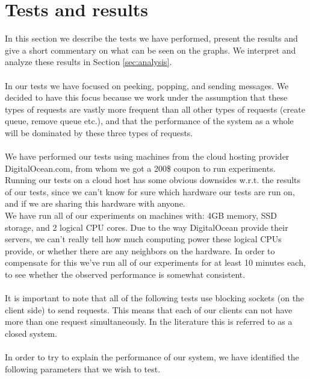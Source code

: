 \documentclass{article}
\begin{document}
    \section{Tests and results}
        \label{sec:tests_and_results}
        In this section we describe the tests we have performed, present the results and give a short commentary on what can be seen on the graphs. We interpret and analyze these results in Section \ref{sec:analysis}.\\
        \\
        In our tests we have focused on peeking, popping, and sending messages. We decided to have this focus because we work under the assumption that these types of requests are vastly more frequent than all other types of requests (create queue, remove queue etc.), and that the performance of the system as a whole will be dominated by these three types of requests.\\
        \\
        We have performed our tests using machines from the cloud hosting provider DigitalOcean.com, from whom we got a 200\$ coupon to run experiments. Running our tests on a cloud host has some obvious downsides w.r.t. the results of our tests, since we can't know for sure which hardware our tests are run on, and if we are sharing this hardware with anyone.\\
        We have run all of our experiments on machines with: 4GB memory, SSD storage, and 2 logical CPU cores. Due to the way DigitalOcean provide their servers, we can't really tell how much computing power these logical CPUs provide, or whether there are any neighbors on the hardware. In order to compensate for this we've run all of our experiments for at least 10 minutes each, to see whether the observed performance is somewhat consistent.\\
        \\
        It is important to note that all of the following tests use blocking sockets (on the client side) to send requests. This means that each of our clients can not have more than one request simultaneously. In the literature this is referred to as a closed system.\\
        \\
        In order to try to explain the performance of our system, we have identified the following parameters that we wish to test.
\end{document}
